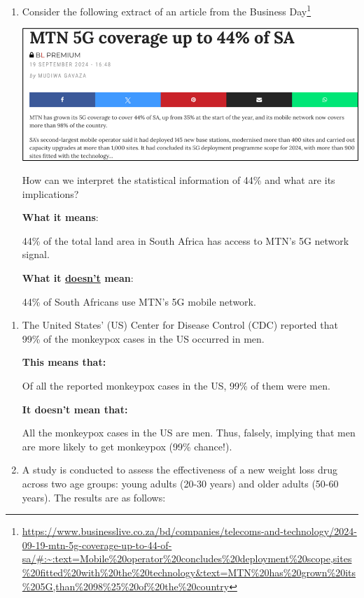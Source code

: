 \documentclass[
]{book}
\begin{document}
\begin{enumerate}
\def\labelenumi{\arabic{enumi}.}
\item
  Consider the following extract of an article from the Business Day\footnote{\url{https://www.businesslive.co.za/bd/companies/telecoms-and-technology/2024-09-19-mtn-5g-coverage-up-to-44-of-sa/\#:~:text=Mobile\%20operator\%20concludes\%20deployment\%20scope,sites\%20fitted\%20with\%20the\%20technology&text=MTN\%20has\%20grown\%20its\%205G,than\%2098\%25\%20of\%20the\%20country}}

  \includegraphics[width=5.20833in,height=\textheight]{images/clipboard-338848850.png}

  How can we interpret the statistical information of 44\% and what are its implications?

  \textbf{What it means}:

  44\% of the total land area in South Africa has access to MTN's 5G network signal.

  \textbf{What it \ul{doesn't} mean}:

  44\% of South Africans use MTN's 5G mobile network.
\end{enumerate}

\begin{enumerate}
\def\labelenumi{\arabic{enumi}.}
\setcounter{enumi}{1}
\item
  The United States' (US) Center for Disease Control (CDC) reported that 99\% of the monkeypox cases in the US occurred in men.

  \textbf{This means that:}

  Of all the reported monkeypox cases in the US, 99\% of them were men.

  \textbf{It doesn't mean that:}

  All the monkeypox cases in the US are men. Thus, falsely, implying that men are more likely to get monkeypox (99\% chance!).
\item
  A study is conducted to assess the effectiveness of a new weight loss drug across two age groups: young adults (20-30 years) and older adults (50-60 years). The results are as follows:
\end{enumerate}
\end{document}

